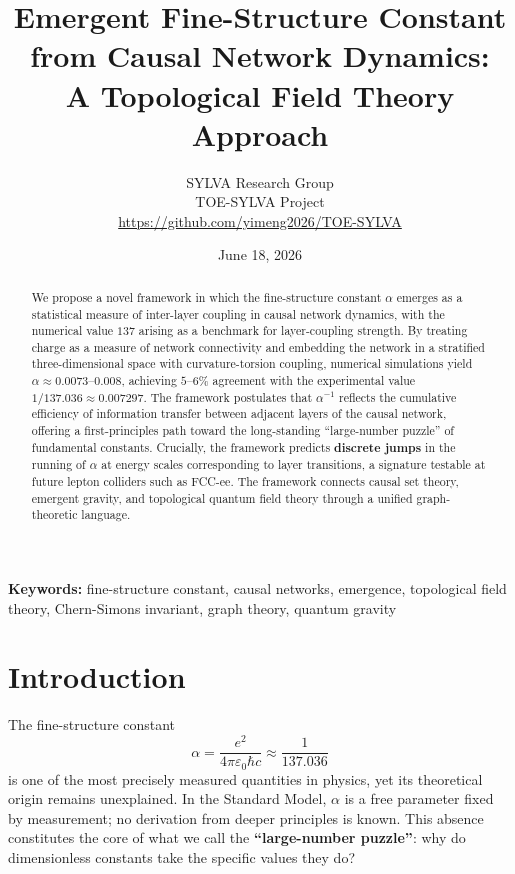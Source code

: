 \documentclass[11pt,a4paper]{article}
\title{\textbf{Emergent Fine-Structure Constant from Causal Network Dynamics:}\\
\textbf{A Topological Field Theory Approach}}
\author{SYLVA Research Group\\
\small TOE-SYLVA Project\\
\small \url{https://github.com/yimeng2026/TOE-SYLVA}}
\date{June 18, 2026}
\theoremstyle{definition}
\theoremstyle{remark}
\begin{document}
\maketitle

\begin{abstract}
We propose a novel framework in which the fine-structure constant $\alpha$
emerges as a statistical measure of inter-layer coupling in causal network
dynamics, with the numerical value $137$ arising as a benchmark for
layer-coupling strength.  By treating charge as a measure of network
connectivity and embedding the network in a stratified three-dimensional
space with curvature-torsion coupling, numerical simulations yield
$\alpha \approx 0.0073\text{--}0.008$, achieving $5\text{--}6\%$ agreement
with the experimental value $1/137.036 \approx 0.007297$.  The framework
postulates that $\alpha^{-1}$ reflects the cumulative efficiency of
information transfer between adjacent layers of the causal network, offering
a first-principles path toward the long-standing ``large-number puzzle'' of
fundamental constants.  Crucially, the framework predicts \textbf{discrete
jumps} in the running of $\alpha$ at energy scales corresponding to layer
transitions, a signature testable at future lepton colliders such as FCC-ee.
The framework connects causal set theory, emergent gravity, and topological
quantum field theory through a unified graph-theoretic language.
\end{abstract}

\vspace{0.5em}
\noindent\textbf{Keywords:} fine-structure constant, causal networks, emergence,
topological field theory, Chern-Simons invariant, graph theory, quantum gravity

\tableofcontents
\newpage

\section{Introduction}\label{sec:intro}

The fine-structure constant
\begin{equation}
\alpha = \frac{e^{2}}{4\pi\varepsilon_{0}\hbar c} \approx \frac{1}{137.036}
\end{equation}
is one of the most precisely measured quantities in physics, yet its theoretical
origin remains unexplained. In the Standard Model, $\alpha$ is a free parameter
fixed by measurement; no derivation from deeper principles is known. This
absence constitutes the core of what we call the \textbf{``large-number
puzzle''}: why do dimensionless constants take the specific values they do?
\end{document}
